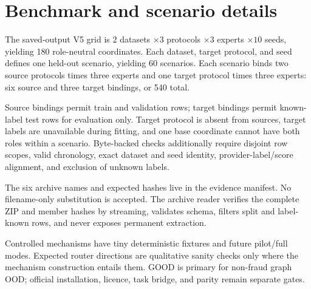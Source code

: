 \section{Benchmark and scenario details}

The saved-output V5 grid is \(2\) datasets \(\times 3\) protocols \(\times 3\) experts \(\times 10\) seeds, yielding 180 role-neutral coordinates. Each dataset, target protocol, and seed defines one held-out scenario, yielding 60 scenarios. Each scenario binds two source protocols times three experts and one target protocol times three experts: six source and three target bindings, or 540 total.

Source bindings permit train and validation rows; target bindings permit known-label test rows for evaluation only. Target protocol is absent from sources, target labels are unavailable during fitting, and one base coordinate cannot have both roles within a scenario. Byte-backed checks additionally require disjoint row scopes, valid chronology, exact dataset and seed identity, provider-label/score alignment, and exclusion of unknown labels.

The six archive names and expected hashes live in the evidence manifest. No filename-only substitution is accepted. The archive reader verifies the complete ZIP and member hashes by streaming, validates schema, filters split and label-known rows, and never exposes permanent extraction.

Controlled mechanisms have tiny deterministic fixtures and future pilot/full modes. Expected router directions are qualitative sanity checks only where the mechanism construction entails them. GOOD is primary for non-fraud graph OOD; official installation, licence, task bridge, and parity remain separate gates.
